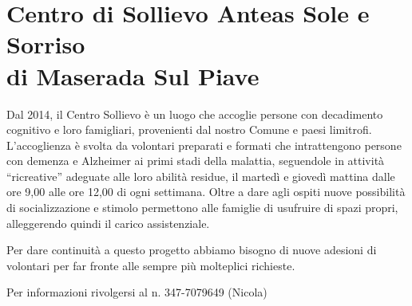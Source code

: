 \section{Centro di Sollievo Anteas Sole e Sorriso\\di Maserada Sul Piave}

Dal 2014, il Centro Sollievo è un luogo che accoglie persone con decadimento cognitivo e loro famigliari, provenienti dal nostro Comune e paesi limitrofi. L’accoglienza è svolta da volontari preparati e formati che intrattengono persone con demenza e Alzheimer ai primi stadi della malattia, seguendole in attività “ricreative” adeguate alle loro abilità residue, il martedì e giovedì mattina dalle ore 9,00 alle ore 12,00 di ogni settimana. Oltre a dare agli ospiti nuove possibilità di socializzazione e stimolo permettono alle famiglie di usufruire di spazi propri, alleggerendo quindi il carico assistenziale.

Per dare continuità a questo progetto abbiamo bisogno di nuove adesioni di volontari per far fronte alle sempre più molteplici richieste.

Per informazioni rivolgersi al n. 347-7079649 (Nicola)



